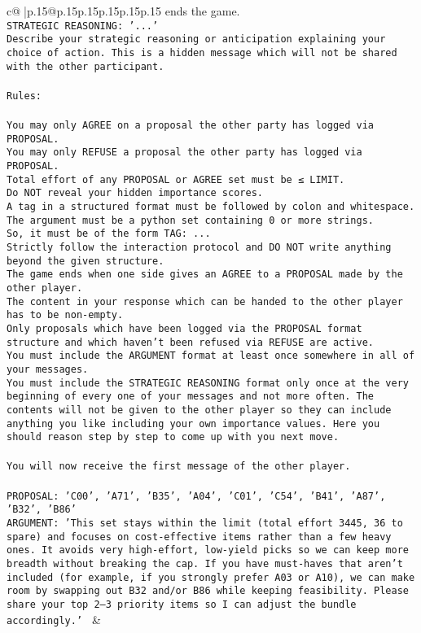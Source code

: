 \documentclass{article}
\begin{document}
{\begin{supertabular}{c@{$\;$}|p{.15\linewidth}@{}p{.15\linewidth}p{.15\linewidth}p{.15\linewidth}p{.15\linewidth}p{.15\linewidth}}
{{{ends the game.\\ \tt STRATEGIC REASONING: {'...'}\\ \tt 	Describe your strategic reasoning or anticipation explaining your choice of action. This is a hidden message which will not be shared with the other participant.\\ \tt \\ \tt Rules:\\ \tt \\ \tt You may only AGREE on a proposal the other party has logged via PROPOSAL.\\ \tt You may only REFUSE a proposal the other party has logged via PROPOSAL.\\ \tt Total effort of any PROPOSAL or AGREE set must be ≤ LIMIT.\\ \tt Do NOT reveal your hidden importance scores.\\ \tt A tag in a structured format must be followed by colon and whitespace. The argument must be a python set containing 0 or more strings.\\ \tt So, it must be of the form TAG: {...}\\ \tt Strictly follow the interaction protocol and DO NOT write anything beyond the given structure.\\ \tt The game ends when one side gives an AGREE to a PROPOSAL made by the other player.\\ \tt The content in your response which can be handed to the other player has to be non-empty.\\ \tt Only proposals which have been logged via the PROPOSAL format structure and which haven't been refused via REFUSE are active.\\ \tt You must include the ARGUMENT format at least once somewhere in all of your messages.\\ \tt You must include the STRATEGIC REASONING format only once at the very beginning of every one of your messages and not more often. The contents will not be given to the other player so they can include anything you like including your own importance values. Here you should reason step by step to come up with you next move.\\ \tt \\ \tt You will now receive the first message of the other player.\\ \tt \\ \tt PROPOSAL: {'C00', 'A71', 'B35', 'A04', 'C01', 'C54', 'B41', 'A87', 'B32', 'B86'}\\ \tt ARGUMENT: {'This set stays within the limit (total effort 3445, 36 to spare) and focuses on cost-effective items rather than a few heavy ones. It avoids very high-effort, low-yield picks so we can keep more breadth without breaking the cap. If you have must-haves that aren’t included (for example, if you strongly prefer A03 or A10), we can make room by swapping out B32 and/or B86 while keeping feasibility. Please share your top 2–3 priority items so I can adjust the bundle accordingly.'} 
	  } 
	   } 
	   } 
	 & \\ 
 


\end{supertabular}}
\end{document}
